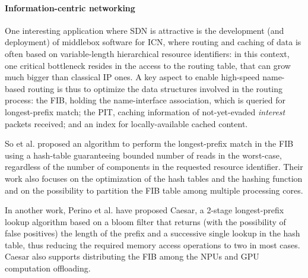 \documentclass[paper=a4, fontsize=11pt]{scrartcl}
\begin{document}
\paragraph{Information-centric networking} One interesting application where \gls{SDN} is attractive is the development (and deployment) of middlebox software for \gls{ICN}, where routing and caching of data is often based on variable-length hierarchical resource identifiers: in this context, one critical bottleneck resides in the access to the routing table, that can grow much bigger than classical IP ones.
A key aspect to enable high-speed name-based routing is thus to optimize the data structures involved in the routing process: the \gls{FIB}, holding the name-interface association, which is queried for longest-prefix match; the \gls{PIT}, caching information of not-yet-evaded \emph{interest} packets received; and an index for locally-available cached content.

So et al.\cite{ndn_fast_dosresistant} proposed an algorithm to perform the longest-prefix match in the \gls{FIB} using a hash-table guaranteeing bounded number of reads in the worst-case, regardless of the number of components in the requested resource identifier. Their work also focuses on the optimization of the hash tables and the hashing function and on the possibility to partition the \gls{FIB} table among multiple processing cores.

In another work, Perino et al.\cite{caesar} have proposed Caesar, a 2-stage longest-prefix lookup algorithm based on a bloom filter that returns (with the possibility of false positives) the length of the prefix and a successive single lookup in the hash table, thus reducing the required memory access operations to two in most cases. Caesar also supports distributing the \gls{FIB} among the NPUs  and GPU computation offloading.

\end{document}
